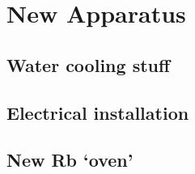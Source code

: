 \appendix
\renewcommand{\thechapter}{B}
\renewcommand{\chaptername}{Appendix}

\chapter{New Apparatus}

\section{Water cooling stuff}
\section{Electrical installation}
\section{New Rb `oven'}

